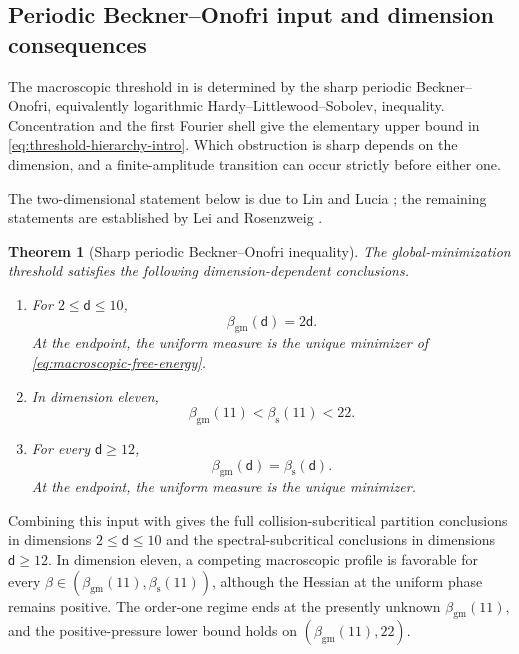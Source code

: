 \documentclass[11pt,reqno]{amsart}
\numberwithin{equation}{section}
\theoremstyle{plain}
\newtheorem{thm}{Theorem}[section]
\theoremstyle{definition}
\renewcommand{\d}{\mathsf d}
\newcommand{\be}{\beta}
\newcommand{\gm}{\mathrm{gm}}
\newcommand{\spec}{\mathrm{s}}
\begin{document}
\subsection{Periodic Beckner--Onofri input and dimension consequences}
\label{subsec:dimension-consequences}

The macroscopic threshold in  is determined by the sharp periodic Beckner--Onofri, equivalently logarithmic Hardy--Littlewood--Sobolev, inequality.  Concentration and the first Fourier shell give the elementary upper bound in \eqref{eq:threshold-hierarchy-intro}.  Which obstruction is sharp depends on the dimension, and a finite-amplitude transition can occur strictly before either one.

The two-dimensional statement below is due to Lin and Lucia \cite[Theorem~1.1 and (1.4)]{LinLucia2007}; the remaining statements are established by Lei and Rosenzweig \cite{LeiRosenzweig2026}.

\begin{thm}[Sharp periodic Beckner--Onofri inequality]
\label{thm:beckner-onofri-input}
The global-minimization threshold satisfies the following dimension-dependent conclusions.
\begin{enumerate}[label=\textup{(\roman*)}]
\item For $2\leq\d\leq10$,
\begin{equation}
 \beta_{\gm}(\d)=2\d.
 \label{eq:gm-low-dimensions}
\end{equation}
At the endpoint, the uniform measure is the unique minimizer of \eqref{eq:macroscopic-free-energy}.

\item In dimension eleven,
\begin{equation}
 \beta_{\gm}(11)<\beta_{\spec}(11)<22.
 \label{eq:dimension-eleven-strict}
\end{equation}

\item For every $\d\geq12$,
\begin{equation}
 \beta_{\gm}(\d)=\beta_{\spec}(\d).
 \label{eq:gm-high-dimensions}
\end{equation}
At the endpoint, the uniform measure is the unique minimizer.
\end{enumerate}
\end{thm}

Combining this input with  gives the full collision-subcritical partition conclusions in dimensions $2\leq\d\leq10$ and the spectral-subcritical conclusions in dimensions $\d\geq12$. In dimension eleven, a competing macroscopic profile is favorable for every $\be\in(\beta_{\gm}(11),\beta_{\spec}(11))$, although the Hessian at the uniform phase remains positive. The order-one regime ends at the presently unknown $\beta_{\gm}(11)$, and the positive-pressure lower bound holds on $(\beta_{\gm}(11),22)$.
\end{document}
